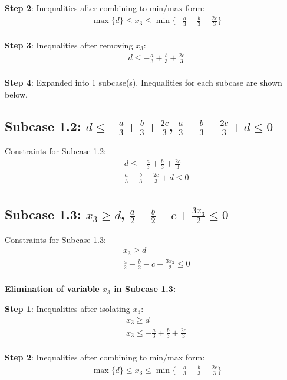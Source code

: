 \documentclass{article}
\begin{document}
\textbf{Step 2}: Inequalities after combining to min/max form:
\begin{align}
& \max\{d\} \leq x_{3} \leq \min\{- \frac{a}{3} + \frac{b}{3} + \frac{2 c}{3}\} \\
\end{align}

\textbf{Step 3}: Inequalities after removing $x_{3}$:
\begin{align}
& d \leq - \frac{a}{3} + \frac{b}{3} + \frac{2 c}{3} \\
\end{align}

\textbf{Step 4}: Expanded into 1 subcase(s). Inequalities for each subcase are shown below.

\subsection{Subcase 1.2: $d \leq - \frac{a}{3} + \frac{b}{3} + \frac{2 c}{3}$, $\frac{a}{3} - \frac{b}{3} - \frac{2 c}{3} + d \leq 0$}

Constraints for Subcase 1.2:
\begin{align}
& d \leq - \frac{a}{3} + \frac{b}{3} + \frac{2 c}{3} \\
& \frac{a}{3} - \frac{b}{3} - \frac{2 c}{3} + d \leq 0 \\
\end{align}

\subsection{Subcase 1.3: $x_{3} \geq d$, $\frac{a}{2} - \frac{b}{2} - c + \frac{3 x_{3}}{2} \leq 0$}

Constraints for Subcase 1.3:
\begin{align}
& x_{3} \geq d \\
& \frac{a}{2} - \frac{b}{2} - c + \frac{3 x_{3}}{2} \leq 0 \\
\end{align}

\textbf{Elimination of variable $x_{3}$ in Subcase 1.3:}

\textbf{Step 1}: Inequalities after isolating $x_{3}$:
\begin{align}
& x_{3} \geq d \\
& x_{3} \leq - \frac{a}{3} + \frac{b}{3} + \frac{2 c}{3} \\
\end{align}

\textbf{Step 2}: Inequalities after combining to min/max form:
\begin{align}
& \max\{d\} \leq x_{3} \leq \min\{- \frac{a}{3} + \frac{b}{3} + \frac{2 c}{3}\} \\
\end{align}
\end{document}
